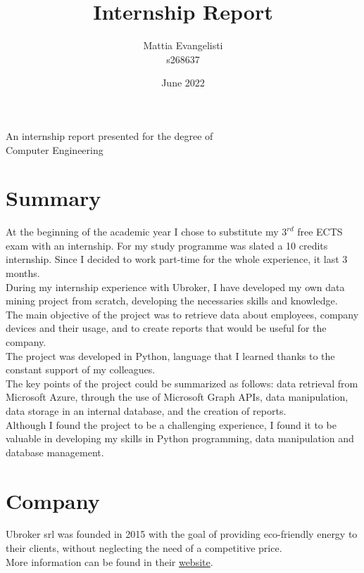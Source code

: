\documentclass[12pt, a4paper, oneside]{article}
\title{\huge \textbf{Internship Report}}
\author{Mattia Evangelisti \\ s268637}
\date{June 2022}
\begin{document}
\begin{titlepage}
    \maketitle
    \begin{center}
        An internship report presented for the degree of\\
        Computer Engineering    
    \end{center}
\end{titlepage}

\tableofcontents
\clearpage\null\newpage


\newpage
\section{Summary}
At the beginning of the academic year I chose to substitute my $3^{rd}$ free ECTS exam with an internship. For my study programme was slated a 10 credits internship. Since I decided to work part-time
for the whole experience, it last 3 months.\\
During my internship experience with Ubroker, I have developed my own data mining project from scratch, developing the necessaries skills and knowledge.\\
The main objective of the project was to retrieve data about employees, company devices and their usage, and to create reports that would be useful for the company.\\
The project was developed in Python, language that I learned thanks to the constant support of my colleagues.\\
The key points of the project could be summarized as follows: data retrieval from Microsoft Azure, through the use of Microsoft Graph APIs, data manipulation, data storage in an internal database,
and the creation of reports.\\
Although I found the project to be a challenging experience, I found it to be valuable in developing my skills in Python programming, data manipulation and database management.\\


\newpage
\section{Company}
Ubroker srl was founded in 2015 with the goal of providing eco-friendly energy to their clients, without neglecting the need of a competitive price.\\
More information can be found in their \href{https://ubroker.it/}{website}.
\end{document}
